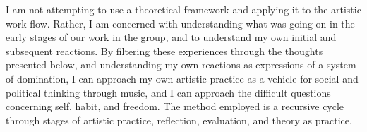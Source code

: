 \documentclass[a4paper]{article}
\begin{document}

I am not attempting to use a theoretical framework and applying it to the artistic work flow. Rather, I am concerned with understanding what was going on in the early stages of our work in the group, and to understand my own initial and subsequent reactions. By filtering these experiences through the thoughts presented below, and understanding my own reactions as expressions of a system of domination, I can approach my own artistic practice as a vehicle for social and political thinking through music, and I can approach the difficult questions concerning self, habit, and freedom. The method employed is a recursive cycle through stages of artistic practice, reflection, evaluation, and theory as practice. 

\section*{ }
\label{sec:self-artist-prod}
\end{document}
